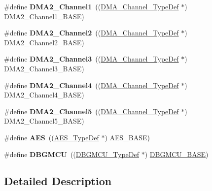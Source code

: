 \begin{DoxyCompactItemize}
\item 
\hypertarget{group___peripheral__declaration_gad86c75e1ff89e03e15570f47962865c8}{\#define {\bfseries D\-M\-A2\-\_\-\-Channel1}~((\hyperlink{struct_d_m_a___channel___type_def}{D\-M\-A\-\_\-\-Channel\-\_\-\-Type\-Def} $\ast$) D\-M\-A2\-\_\-\-Channel1\-\_\-\-B\-A\-S\-E)}\label{group___peripheral__declaration_gad86c75e1ff89e03e15570f47962865c8}

\item 
\hypertarget{group___peripheral__declaration_ga316024020799373b9d8e35c316c74f24}{\#define {\bfseries D\-M\-A2\-\_\-\-Channel2}~((\hyperlink{struct_d_m_a___channel___type_def}{D\-M\-A\-\_\-\-Channel\-\_\-\-Type\-Def} $\ast$) D\-M\-A2\-\_\-\-Channel2\-\_\-\-B\-A\-S\-E)}\label{group___peripheral__declaration_ga316024020799373b9d8e35c316c74f24}

\item 
\hypertarget{group___peripheral__declaration_ga6dca52a79587e0ca9a5d669048b4c7eb}{\#define {\bfseries D\-M\-A2\-\_\-\-Channel3}~((\hyperlink{struct_d_m_a___channel___type_def}{D\-M\-A\-\_\-\-Channel\-\_\-\-Type\-Def} $\ast$) D\-M\-A2\-\_\-\-Channel3\-\_\-\-B\-A\-S\-E)}\label{group___peripheral__declaration_ga6dca52a79587e0ca9a5d669048b4c7eb}

\item 
\hypertarget{group___peripheral__declaration_ga612b396657695191ad740b0b59bc9f12}{\#define {\bfseries D\-M\-A2\-\_\-\-Channel4}~((\hyperlink{struct_d_m_a___channel___type_def}{D\-M\-A\-\_\-\-Channel\-\_\-\-Type\-Def} $\ast$) D\-M\-A2\-\_\-\-Channel4\-\_\-\-B\-A\-S\-E)}\label{group___peripheral__declaration_ga612b396657695191ad740b0b59bc9f12}

\item 
\hypertarget{group___peripheral__declaration_ga521c13b7d0f82a6897d47995da392750}{\#define {\bfseries D\-M\-A2\-\_\-\-Channel5}~((\hyperlink{struct_d_m_a___channel___type_def}{D\-M\-A\-\_\-\-Channel\-\_\-\-Type\-Def} $\ast$) D\-M\-A2\-\_\-\-Channel5\-\_\-\-B\-A\-S\-E)}\label{group___peripheral__declaration_ga521c13b7d0f82a6897d47995da392750}

\item 
\hypertarget{group___peripheral__declaration_ga5412ac9ff64f4ab68c289a0da739eaef}{\#define {\bfseries A\-E\-S}~((\hyperlink{struct_a_e_s___type_def}{A\-E\-S\-\_\-\-Type\-Def} $\ast$) A\-E\-S\-\_\-\-B\-A\-S\-E)}\label{group___peripheral__declaration_ga5412ac9ff64f4ab68c289a0da739eaef}

\item 
\hypertarget{group___peripheral__declaration_ga92ec6d9ec2251fda7d4ce09748cd74b4}{\#define {\bfseries D\-B\-G\-M\-C\-U}~((\hyperlink{struct_d_b_g_m_c_u___type_def}{D\-B\-G\-M\-C\-U\-\_\-\-Type\-Def} $\ast$) \hyperlink{group___peripheral__memory__map_ga4adaf4fd82ccc3a538f1f27a70cdbbef}{D\-B\-G\-M\-C\-U\-\_\-\-B\-A\-S\-E})}\label{group___peripheral__declaration_ga92ec6d9ec2251fda7d4ce09748cd74b4}

\end{DoxyCompactItemize}


\subsection{Detailed Description}
